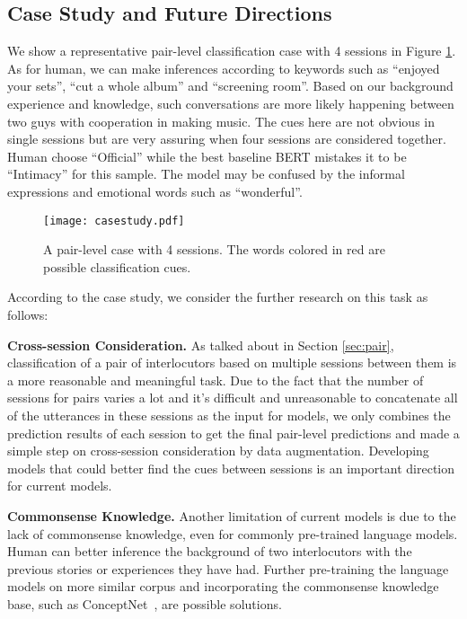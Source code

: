 \documentclass[letterpaper]{article} \usepackage{aaai21}  \usepackage{times}  \usepackage{helvet} \usepackage{courier}  \usepackage[hyphens]{url}  \usepackage{graphicx} \usepackage{xcolor}
\begin{document}
\subsection{Case Study and Future Directions}
We show a representative pair-level classification case with 4 sessions in Figure \ref{fig:case}. As for human, we can make inferences according to keywords 
such as ``enjoyed your sets'', ``cut a whole album'' and ``screening room''. Based on our background experience and knowledge, such conversations are more likely happening between two guys with cooperation in making music. The cues here are not obvious in single sessions but are very assuring when four sessions are considered together. Human choose ``Official'' while the best baseline BERT mistakes it to be ``Intimacy'' for this sample. The model may be confused by the informal expressions and emotional words such as ``wonderful''.


\begin{figure}[t!]
	\centering
	\texttt{[image: casestudy.pdf]}
	\caption{A pair-level case with 4 sessions. The words colored in red are possible classification cues. }
	\label{fig:case}
\end{figure}

According to the case study, we consider the further research on this task as follows:

\textbf{Cross-session Consideration.} As talked about in Section \ref{sec:pair}, classification of a pair of interlocutors based on multiple sessions between them is a more reasonable and meaningful task. Due to the fact that the number of sessions for pairs varies a lot and it's difficult and unreasonable to concatenate all of the utterances in these sessions as the input for models, we only combines the prediction results of each session to get the final pair-level predictions and made a simple step on cross-session consideration by data augmentation. Developing models that could better find the cues between sessions is an important direction for current models.

\textbf{Commonsense Knowledge.} Another limitation of current models is due to the lack of commonsense knowledge, even for commonly pre-trained language models. Human can better inference the background of two interlocutors with the previous stories or experiences they have had. Further pre-training the language models on more similar corpus and incorporating the commonsense knowledge base, such as ConceptNet~\cite{SpeerCH17}, are possible solutions.
 
\end{document}
